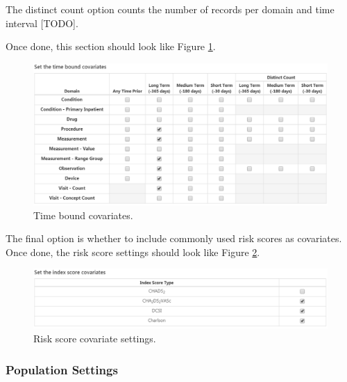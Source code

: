 \documentclass[11pt]{book}
\theoremstyle{definition}
\theoremstyle{definition}
\theoremstyle{definition}
\theoremstyle{remark}
\begin{document}
The distinct count option counts the number of records per domain and time interval {[}TODO{]}.

Once done, this section should look like Figure \ref{fig:covariateSettings5}.

\begin{figure}

{\centering \includegraphics[width=1\linewidth]{images/PatientLevelPrediction/covariateSettings5} 

}

\caption{Time bound covariates.}\label{fig:covariateSettings5}
\end{figure}

The final option is whether to include commonly used risk scores as covariates. Once done, the risk score settings should look like Figure \ref{fig:covariateSettings6}.

\begin{figure}

{\centering \includegraphics[width=1\linewidth]{images/PatientLevelPrediction/covariateSettings6} 

}

\caption{Risk score covariate settings.}\label{fig:covariateSettings6}
\end{figure}

\hypertarget{population-settings}{%
\subsubsection*{Population Settings}\label{population-settings}}
\end{document}
